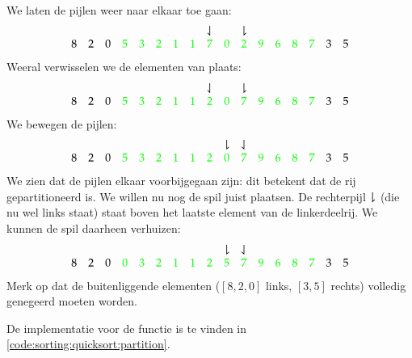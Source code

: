 \begin{example}
\[\begin{array}{ccccccccccccccccc}
  \end{array}
\]
We laten de pijlen weer naar elkaar toe gaan:
\[
  \begin{array}{ccccccccccccccccc}
      &   &   &   &  &   & &   & \downharpoonleft &   & \downharpoonright &   & &   & &   &   \\
    8 & 2 & 0 & {\color{green}5} & {\color{green}3} & {\color{green}2} & {\color{green}1} & {\color{green}1} & {\color{green}7} & {\color{green}0} & {\color{green}2} & {\color{green}9} & {\color{green}6} & {\color{green}8} & {\color{green}7} & 3 & 5
  \end{array}
\]
Weeral verwisselen we de elementen van plaats:
\[
  \begin{array}{ccccccccccccccccc}
      &   &   &   &  &   & &   & \downharpoonleft &   & \downharpoonright &   & &   & &   &   \\
    8 & 2 & 0 & {\color{green}5} & {\color{green}3} & {\color{green}2} & {\color{green}1} & {\color{green}1} & {\color{green}2} & {\color{green}0} & {\color{green}7} & {\color{green}9} & {\color{green}6} & {\color{green}8} & {\color{green}7} & 3 & 5
  \end{array}
\]
We bewegen de pijlen:
\[
  \begin{array}{ccccccccccccccccc}
      &   &   &   &  &   & &   & & \downharpoonright & \downharpoonleft &   & &   & &   &   \\
    8 & 2 & 0 & {\color{green}5} & {\color{green}3} & {\color{green}2} & {\color{green}1} & {\color{green}1} & {\color{green}2} & {\color{green}0} & {\color{green}7} & {\color{green}9} & {\color{green}6} & {\color{green}8} & {\color{green}7} & 3 & 5
  \end{array}
\]
We zien dat de pijlen elkaar voorbijgegaan zijn: dit betekent dat de rij
gepartitioneerd is. We willen nu nog de spil juist plaatsen.
De rechterpijl $\downharpoonright$ (die nu wel links staat) staat boven het laatste
element van de linkerdeelrij. We kunnen de spil daarheen verhuizen:
\[
  \begin{array}{ccccccccccccccccc}
      &   &   &   &  &   & &   & & \downharpoonright & \downharpoonleft &   & &   & &   &   \\
    8 & 2 & 0 & {\color{green}0} & {\color{green}3} & {\color{green}2} & {\color{green}1} & {\color{green}1} & {\color{green}2} & {\color{green}5} & {\color{green}7} & {\color{green}9} & {\color{green}6} & {\color{green}8} & {\color{green}7} & 3 & 5
  \end{array}
\]
Merk op dat de buitenliggende elementen ($[8, 2, 0]$ links, $[3, 5]$ rechts) volledig genegeerd moeten worden.
\end{example}


De implementatie voor de functie  is te vinden in
\cref{code:sorting:quicksort:partition}.

